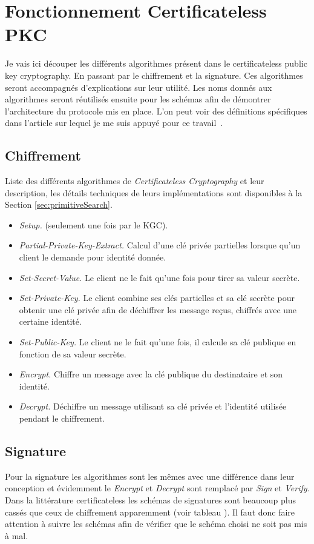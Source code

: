 \section{Fonctionnement Certificateless PKC}
Je vais ici découper les différents algorithmes présent dans le certificateless public key cryptography. En passant par le chiffrement et la signature.
Ces algorithmes seront accompagnés d'explications sur leur utilité. Les noms donnés aux algorithmes seront réutilisés ensuite pour les schémas afin de démontrer l'architecture du protocole mis en place. L'on peut voir des définitions spécifiques dans l'article sur lequel je me suis appuyé pour ce travail~\cite{DBLP:conf/pkc/DentLP08}.
\subsection{Chiffrement}
Liste des différents algorithmes de \textit{Certificateless Cryptography} et leur description, les détails techniques de leurs implémentations sont disponibles à la Section \ref{sec:primitiveSearch}.
\begin{itemize}
	\item \textit{Setup.} (seulement une fois par le KGC).
	\item \textit{Partial-Private-Key-Extract.} Calcul d'une clé privée partielles lorsque qu'un client le demande pour identité donnée.
	\item \textit{Set-Secret-Value.} Le client ne le fait qu'une fois pour tirer sa valeur secrète.
	\item \textit{Set-Private-Key.} Le client combine ses clés partielles et sa clé secrète pour obtenir une clé privée afin de déchiffrer les message reçus, chiffrés avec une certaine identité.
	\item \textit{Set-Public-Key.} Le client ne le fait qu'une fois, il calcule sa clé publique en fonction de sa valeur secrète.
	\item \textit{Encrypt.} Chiffre un message avec la clé publique du destinataire et son identité.
	\item \textit{Decrypt.} Déchiffre un message utilisant sa clé privée et l'identité utilisée pendant le chiffrement.
\end{itemize}
\subsection{Signature}
Pour la signature les algorithmes sont les mêmes avec une différence dans leur conception et évidemment le \textit{Encrypt} et \textit{Decrypt} sont remplacé par \textit{Sign} et \textit{Verify}.
Dans la littérature certificateless les schémas de signatures sont beaucoup plus cassés que ceux de chiffrement apparemment (voir tableau ). Il faut donc faire attention à suivre les schémas afin de vérifier que le schéma choisi ne soit pas mis à mal.
